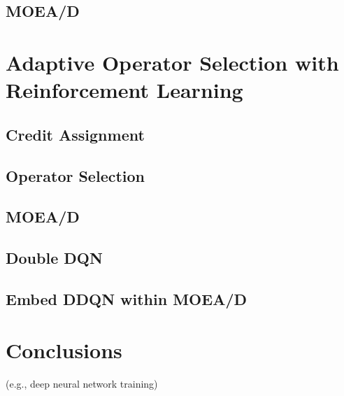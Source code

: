 \documentclass[journal]{IEEEtran}
\begin{document}
\subsection{MOEA/D}


\section{Adaptive Operator Selection with Reinforcement Learning}

\subsection{Credit Assignment}

\subsection{Operator Selection}

\subsection{MOEA/D}

\subsection{Double DQN}

\subsection{Embed DDQN within MOEA/D}

\section{Conclusions}


 (e.g., deep neural network training)

\ifCLASSOPTIONcaptionsoff
  \newpage
\fi



\end{document}
